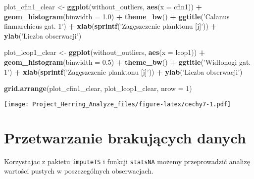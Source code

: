 \documentclass[]{article}
\newenvironment{Shaded}{\begin{snugshade}}{\end{snugshade}}
\newcommand{\ControlFlowTok}[1]{\textcolor[rgb]{0.13,0.29,0.53}{\textbf{#1}}}
\newcommand{\DataTypeTok}[1]{\textcolor[rgb]{0.13,0.29,0.53}{#1}}
\newcommand{\DecValTok}[1]{\textcolor[rgb]{0.00,0.00,0.81}{#1}}
\newcommand{\FloatTok}[1]{\textcolor[rgb]{0.00,0.00,0.81}{#1}}
\newcommand{\KeywordTok}[1]{\textcolor[rgb]{0.13,0.29,0.53}{\textbf{#1}}}
\newcommand{\NormalTok}[1]{#1}
\newcommand{\OperatorTok}[1]{\textcolor[rgb]{0.81,0.36,0.00}{\textbf{#1}}}
\newcommand{\OtherTok}[1]{\textcolor[rgb]{0.56,0.35,0.01}{#1}}
\newcommand{\StringTok}[1]{\textcolor[rgb]{0.31,0.60,0.02}{#1}}
\begin{document}
\begin{Shaded}
\begin{Highlighting}[]
\NormalTok{plot_cfin1_clear <-}\StringTok{ }\KeywordTok{ggplot}\NormalTok{(without_outliers, }\KeywordTok{aes}\NormalTok{(}\DataTypeTok{x =}\NormalTok{ cfin1)) }\OperatorTok{+}\StringTok{ }\KeywordTok{geom_histogram}\NormalTok{(}\DataTypeTok{binwidth =} \FloatTok{1.0}\NormalTok{) }\OperatorTok{+}
\StringTok{  }\KeywordTok{theme_bw}\NormalTok{() }\OperatorTok{+}\StringTok{ }\KeywordTok{ggtitle}\NormalTok{(}\StringTok{'Calanus finmarchicus gat. 1'}\NormalTok{) }\OperatorTok{+}\StringTok{ }
\StringTok{  }\KeywordTok{xlab}\NormalTok{(}\KeywordTok{sprintf}\NormalTok{(}\StringTok{'Zagęszczenie planktonu [j]'}\NormalTok{)) }\OperatorTok{+}\StringTok{ }\KeywordTok{ylab}\NormalTok{(}\StringTok{'Liczba obserwacji'}\NormalTok{)}

\NormalTok{plot_lcop1_clear <-}\StringTok{ }\KeywordTok{ggplot}\NormalTok{(without_outliers, }\KeywordTok{aes}\NormalTok{(}\DataTypeTok{x =}\NormalTok{ lcop1)) }\OperatorTok{+}\StringTok{ }\KeywordTok{geom_histogram}\NormalTok{(}\DataTypeTok{binwidth =} \FloatTok{0.5}\NormalTok{) }\OperatorTok{+}
\StringTok{  }\KeywordTok{theme_bw}\NormalTok{() }\OperatorTok{+}\StringTok{ }\KeywordTok{ggtitle}\NormalTok{(}\StringTok{'Widłonogi gat. 1'}\NormalTok{) }\OperatorTok{+}\StringTok{ }
\StringTok{  }\KeywordTok{xlab}\NormalTok{(}\KeywordTok{sprintf}\NormalTok{(}\StringTok{'Zagęszczenie planktonu [j]'}\NormalTok{)) }\OperatorTok{+}\StringTok{ }\KeywordTok{ylab}\NormalTok{(}\StringTok{'Liczba obserwacji'}\NormalTok{)}

\KeywordTok{grid.arrange}\NormalTok{(plot_cfin1_clear, plot_lcop1_clear, }\DataTypeTok{nrow =} \DecValTok{1}\NormalTok{)}
\end{Highlighting}
\end{Shaded}

\texttt{[image: Project\_Herring\_Analyze\_files/figure-latex/cechy7-1.pdf]}

\hypertarget{przetwarzanie-brakujux105cych-danych}{%
\section{Przetwarzanie brakujących
danych}\label{przetwarzanie-brakujux105cych-danych}}

Korzystajac z pakietu \texttt{imputeTS} i funkcji \texttt{statsNA}
możemy przeprowadzić analizę wartości pustych w poszczególnych
obserwacjach.

\begin{Shaded}
\end{Shaded}
\end{document}
